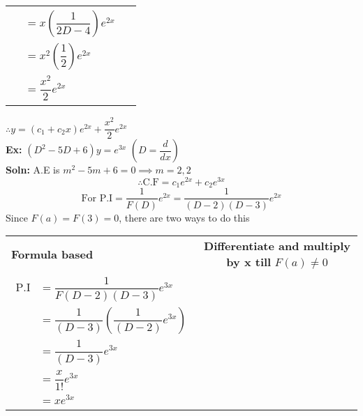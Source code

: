 \documentclass[a4paper, titlepage]{article}
\begin{document}
\begin{enumerate}[label=\textbf{\Roman*}]
\begin{tabularx}{\linewidth}{X | c}
\begin{minipage}[c]{0.5\linewidth}
{\begin{align*}
                                       &= x\left(\dfrac{1}{2D - 4}\right)e^{2x} \\
                                       &= x^2\left(\dfrac{1}{2}\right)e^{2x} \\
                                       &= \dfrac{x^2}{2}e^{2x}
                        \end{align*}
                    }
                \end{minipage}
            \end{tabularx}
            $\therefore y = (c_1 + c_2x)e^{2x} + \dfrac{x^2}{2}e^{2x}$ \hfill \\
                        
            \textbf{Ex: } $(D^2 -5D + 6)y = e^{3x}$
            $\left(D = \dfrac{d}{dx}\right)$ \hfill \\
            \textbf{Soln: }A.E is $m^2 -5m + 6 = 0 \implies m = 2, 2 $
            \[ \therefore \text{C.F} = c_1e^{2x} + c_2e^{3x} \]
            \[
            \text{For P.I} = \dfrac{1}{F(D)}e^{2x} 
                = \dfrac{1}{(D-2)(D-3)}e^{2x}
            \]
            Since $F(a) = F(3) = 0$, there are two ways to do this \hfill \\
            \begin{tabularx}{\linewidth}{X | c}
                \textbf{Formula based} & 
                \textbf{Differentiate and multiply by x till }
                $F(a) \ne 0$ \\
                \begin{minipage}[c]{0.5\linewidth}
                    {
                        \begin{align*}
                            \text{P.I} &= \dfrac{1}{F(D-2)(D-3)}e^{3x} \\
                                       &= \dfrac{1}{(D-3)} \left(\dfrac{1}{(D-2)}e^{3x}\right) \\
                                       &= \dfrac{1}{(D-3)}e^{3x} \\
                                       &= \dfrac{x}{1!}e^{3x} \\
                                       &= xe^{3x}
                        \end{align*}
                    }
                \end{minipage}
                & 
                \begin{minipage}[c]{0.5\linewidth}
                    {
                        \begin{align*}

\end{align*}}
\end{minipage}
\end{tabularx}
\end{enumerate}
\end{document}
